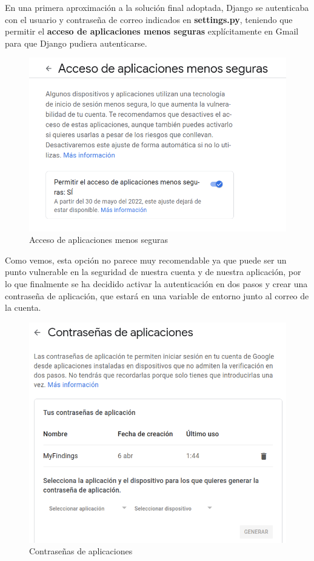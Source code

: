 En una primera aproximación a la solución final adoptada, Django se autenticaba con el
usuario y contraseña de correo indicados en \textbf{settings.py}, teniendo que permitir
el \textbf{acceso de aplicaciones menos seguras} explícitamente en Gmail para que Django
pudiera autenticarse.

    \begin{figure}[H]
        \centering
        \includegraphics[scale=0.40]{imagenes/apps-access.png}
        \caption{Acceso de aplicaciones menos seguras}
        \label{fig:apps-access}
    \end{figure}

Como vemos, esta opción no parece muy recomendable ya que puede ser un punto vulnerable
en la seguridad de nuestra cuenta y de nuestra aplicación, por lo que finalmente se ha
decidido activar la autenticación en dos pasos y crear una contraseña de aplicación,
que estará en una variable de entorno junto al correo de la cuenta.

    \begin{figure}[H]
        \centering
        \includegraphics[scale=0.35]{imagenes/apps-pass.png}
        \caption{Contraseñas de aplicaciones}
        \label{fig:apps-pass}
    \end{figure}

